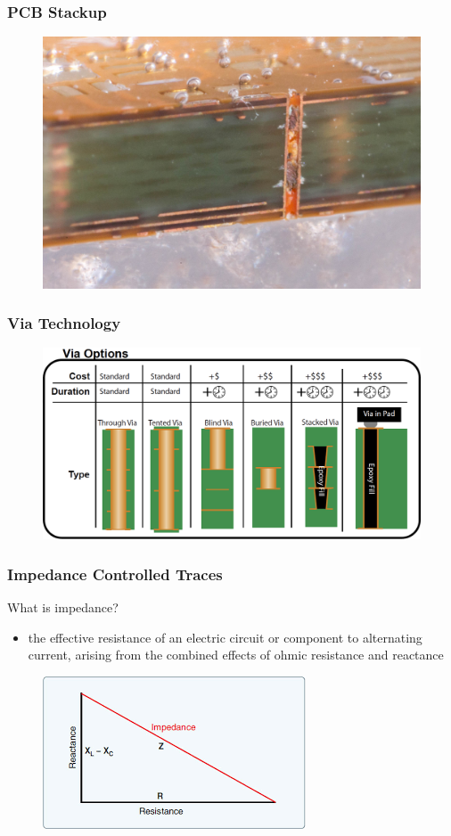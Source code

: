 \documentclass[t]{beamer}
\begin{document}
\begin{frame}
	\frametitle{PCB Stackup}
	\begin{figure}
		\includegraphics[width=0.8\linewidth]{crossSection2.jpg}
	\end{figure}
\end{frame}
\begin{frame}
\frametitle{Via Technology}
\begin{figure}
	\includegraphics[width=\linewidth]{vias.png}
\end{figure}
\end{frame}
\begin{frame}
\frametitle{Impedance Controlled Traces}
What is impedance?\\
\begin{itemize}
	\item the effective resistance of an electric circuit or component to alternating current, arising from the combined effects of ohmic resistance and reactance
\end{itemize}
\begin{figure}
	\includegraphics[width=0.5\linewidth]{impedance.png}
\end{figure}

\end{frame}
\end{document}

